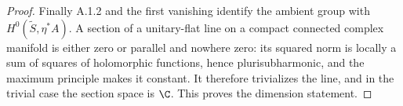 \begin{proof}
Finally A.1.2 and the first vanishing identify the ambient group with $H^0(\widetilde S,\eta^*A)$. A section of a unitary-flat line on a compact connected complex manifold is either zero or parallel and nowhere zero: its squared norm is locally a sum of squares of holomorphic functions, hence plurisubharmonic, and the maximum principle makes it constant. It therefore trivializes the line, and in the trivial case the section space is $\C$. This proves the dimension statement.
\end{proof}



